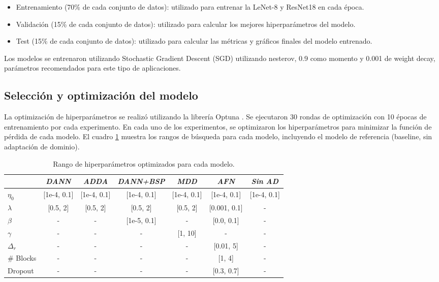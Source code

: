 \begin{itemize}
    \item Entrenamiento (70\% de cada conjunto de datos): utilizado para entrenar la LeNet-8 y ResNet18 en cada época.
    \item Validación (15\% de cada conjunto de datos): utilizado para calcular los mejores hiperparámetros del modelo.
    \item Test (15\% de cada conjunto de datos): utilizado para calcular las métricas y gráficos finales del modelo entrenado.
\end{itemize}

Los modelos se entrenaron utilizando Stochastic Gradient Descent (SGD) \parencite{sutskever2013importance} utilizando nesterov, 0.9 como momento y 0.001 de weight decay, parámetros recomendados
para este tipo de aplicaciones.

\subsection{Selección y optimización del modelo}

La optimización de hiperparámetros se realizó utilizando la librería Optuna \parencite{optuna_2019}. Se ejecutaron 30 rondas de optimización con 10 épocas de entrenamiento por cada experimento. En
cada uno de los experimentos, se optimizaron los hiperparámetros para minimizar la función de pérdida de cada modelo.
El cuadro \ref{tab:rangos-hiperparametros} muestra los rangos de búsqueda para cada modelo, incluyendo el modelo de
referencia (baseline, sin adaptación de dominio).

\begin{table}[H]
    \centering
    \begin{tabular}{l|cccccc}
        \toprule
                   & {\it DANN}  & {\it ADDA}  & {\it DANN+BSP} & {\it MDD}   & {\it AFN}    & {\it Sin AD} \\
        \midrule
        $\eta_0$   & [1e-4, 0.1] & [1e-4, 0.1] & [1e-4, 0.1]    & [1e-4, 0.1] & [1e-4, 0.1]  & [1e-4, 0.1]  \\
        $\lambda$  & [0.5, 2]    & [0.5, 2]    & [0.5, 2]       & [0.5, 2]    & [0.001, 0.1] & -            \\
        $\beta$    & -           & -           & [1e-5, 0.1]    & -           & [0.0, 0.1]   & -            \\
        $\gamma$   & -           & -           & -              & [1, 10]     & -            & -            \\
        $\Delta_r$ & -           & -           & -              & -           & [0.01, 5]    & -            \\
        \# Blocks  & -           & -           & -              & -           & [1, 4]       & -            \\
        Dropout    & -           & -           & -              & -           & [0.3, 0.7]   & -            \\
        \bottomrule
    \end{tabular}
    \caption[Rango de hiperparámetros optimizados]{Rango de hiperparámetros optimizados para cada modelo.}
    \label{tab:rangos-hiperparametros}
\end{table}

